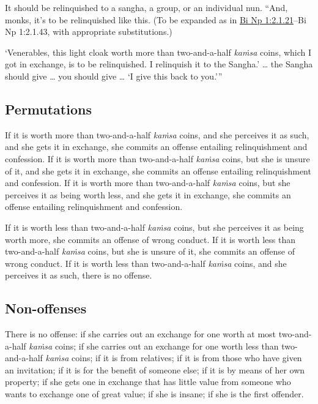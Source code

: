 \documentclass[12pt,openany]{book}%
\begin{document}
It should be relinquished to a sangha, a group, or an individual nun. “And, monks, it’s to be relinquished like this.  (To be expanded as in \href{https://suttacentral.net/pli-tv-bi-vb-np1/en/brahmali\#2.1.21}{Bi Np 1:2.1.21}–Bi Np 1:2.1.43, with appropriate substitutions.) 

‘Venerables, this light cloak worth more than two-and-a-half \textit{\textsanskrit{kaṁsa}} coins, which I got in exchange, is to be relinquished. I relinquish it to the Sangha.’ … the Sangha should give … you should give … ‘I give this back to you.’” 

\subsection*{Permutations }

If it is worth more than two-and-a-half \textit{\textsanskrit{kaṁsa}} coins, and she perceives it as such, and she gets it in exchange, she commits an offense entailing relinquishment and confession. If it is worth more than two-and-a-half \textit{\textsanskrit{kaṁsa}} coins, but she is unsure of it, and she gets it in exchange, she commits an offense entailing relinquishment and confession. If it is worth more than two-and-a-half \textit{\textsanskrit{kaṁsa}} coins, but she perceives it as being worth less, and she gets it in exchange, she commits an offense entailing relinquishment and confession. 

If it is worth less than two-and-a-half \textit{\textsanskrit{kaṁsa}} coins, but she perceives it as being worth more, she commits an offense of wrong conduct. If it is worth less than two-and-a-half \textit{\textsanskrit{kaṁsa}} coins, but she is unsure of it, she commits an offense of wrong conduct. If it is worth less than two-and-a-half \textit{\textsanskrit{kaṁsa}} coins, and she perceives it as such, there is no offense. 

\subsection*{Non-offenses }

There is no offense: if she carries out an exchange for one worth at most two-and-a-half \textit{\textsanskrit{kaṁsa}} coins;  if she carries out an exchange for one worth less than two-and-a-half \textit{\textsanskrit{kaṁsa}} coins;  if it is from relatives;  if it is from those who have given an invitation;  if it is for the benefit of someone else;  if it is by means of her own property;  if she gets one in exchange that has little value from someone who wants to exchange one of great value;  if she is insane;  if she is the first offender. 
\end{document}
